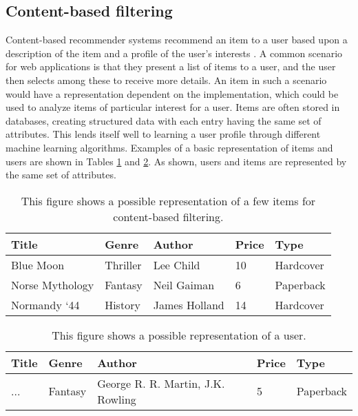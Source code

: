 \subsection{Content-based filtering}\label{content-based-filtering}
Content-based recommender systems recommend an item to a user based upon a description of the item and a profile of the user's interests \cite{ContentBasedFiltering}.
A common scenario for web applications is that they present a list of items to a user, and the user then selects among these to receive more details. 
An item in such a scenario would have a representation dependent on the implementation, which could be used to analyze items of particular interest for a user.
Items are often stored in databases, creating structured data with each entry having the same set of attributes. 
This lends itself well to learning a user profile through different machine learning algorithms.
Examples of a basic representation of items and users are shown in Tables \ref{tbl:content-item} and \ref{tbl:content-user}.
As shown, users and items are represented by the same set of attributes.
\begin{table}[H]
    \centering
    \begin{tabular}{|l|l|l|l|l|}
    \hline
    Title                                         & Genre    & Author        & Price & Type      \\ \hline
    Blue Moon                                     & Thriller & Lee Child     & 10    & Hardcover \\ \hline
    Norse Mythology                               & Fantasy  & Neil Gaiman   & 6     & Paperback \\ \hline
    Normandy ‘44                                  & History  & James Holland & 14    & Hardcover \\ \hline
    \end{tabular}
    \caption{This figure shows a possible representation of a few items for content-based filtering.}
    \label{tbl:content-item}
\end{table}
\begin{table}[H]
    \centering
    \begin{tabular}{|l|l|l|l|l|}
    \hline
    Title                                         & Genre    & Author        & Price & Type      \\ \hline
    ... & Fantasy  & George R. R. Martin, J.K. Rowling & 5    & Paperback \\\hline
    \end{tabular}
    \caption{This figure shows a possible representation of a user.}
    \label{tbl:content-user}
\end{table}
